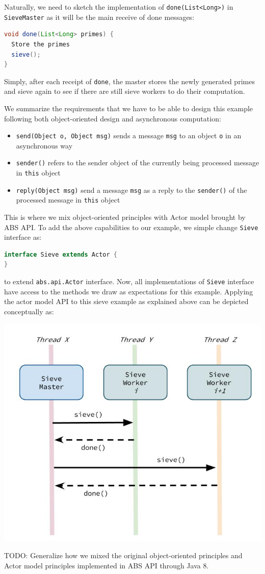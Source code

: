 Naturally, we need to sketch the implementation of
\lstinline!done(List<Long>)! in \lstinline!SieveMaster! as it will be
the main receive of done messages:

\begin{lstlisting}[language=Java]
void done(List<Long> primes) {
  Store the primes
  sieve();
}
\end{lstlisting}

Simply, after each receipt of \lstinline!done!, the master stores the
newly generated primes and sieve again to see if there are still sieve
workers to do their computation.

We summarize the requirements that we have to be able to design this
example following both object-oriented design and asynchronous
computation:

\begin{itemize}
\itemsep1pt\parskip0pt
\item
  \lstinline!send(Object o, Object msg)! sends a message \lstinline!msg!
  to an object \lstinline!o! in an asynchronous way\\
\item
  \lstinline!sender()! refers to the sender object of the currently
  being processed message in \lstinline!this! object\\
\item
  \lstinline!reply(Object msg)! send a message \lstinline!msg! as a
  reply to the \lstinline!sender()! of the processed message in
  \lstinline!this! object
\end{itemize}

This is where we mix object-oriented principles with Actor model brought
by ABS API. To add the above capabilities to our example, we simple
change \lstinline!Sieve! interface as:

\begin{lstlisting}[language=Java]
interface Sieve extends Actor {
}
\end{lstlisting}

to extend \lstinline!abs.api.Actor! interface. Now, all implementations
of \lstinline!Sieve! interface have access to the methods we draw as
expectations for this example. Applying the actor model API to this
sieve example as explained above can be depicted conceptually as:

\includegraphics{figs/PrimeSievesControlFlow.jpg}

TODO: Generalize how we mixed the original object-oriented principles
and Actor model principles implemented in ABS API through Java 8.
